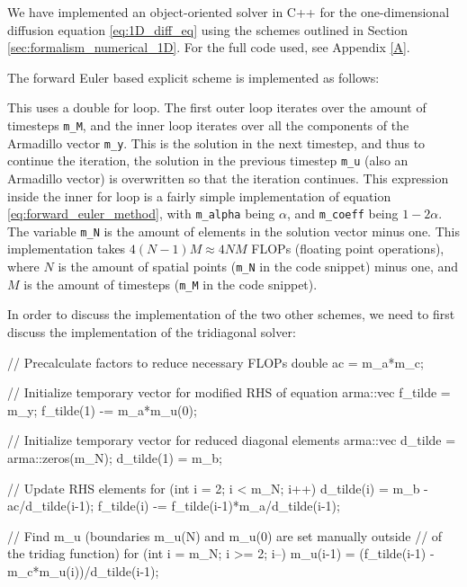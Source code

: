\documentclass[reprint,english,notitlepage]{revtex4-1}  %
\begin{document}
We have implemented an object-oriented solver in C++ for the one-dimensional diffusion equation \eqref{eq:1D_diff_eq} using the schemes outlined in Section \ref{sec:formalism_numerical_1D}. For the full code used, see Appendix \ref{A}.

The forward Euler based explicit scheme is implemented as follows:

\begin{cpp}
// Iterate over timesteps
for (int j = 1; j <= m_M; j++){
  // Matrix multiplication with tridiagonal matrix
  for (int i = 1; i < m_N; i++){
    m_y(i) = m_coeff*m_u(i) + m_alpha*(m_u(i+1) + m_u(i-1));
  }

  // Update previous solution
  m_u = m_y;
  }
}
\end{cpp}

This uses a double for loop. The first outer loop iterates over the amount of timesteps \verb+m_M+, and the inner loop iterates over all the components of the Armadillo \citep{Armadillo} vector \verb+m_y+. This is the solution in the next timestep, and thus to continue the iteration, the solution in the previous timestep \verb+m_u+ (also an Armadillo vector) is overwritten so that the iteration continues. This expression inside the inner for loop is a fairly simple implementation of equation \eqref{eq:forward_euler_method}, with \verb+m_alpha+ being $\alpha$, and \verb+m_coeff+ being $1 - 2\alpha$. The variable \verb+m_N+ is the amount of elements in the solution vector minus one. This implementation takes $4(N-1)M \approx 4NM$ FLOPs (floating point operations), where $N$ is the amount of spatial points (\verb+m_N+ in the code snippet) minus one, and $M$ is the amount of timesteps (\verb+m_M+ in the code snippet).

In order to discuss the implementation of the two other schemes, we need to first discuss the implementation of the tridiagonal solver:

\begin{cpp}
// Precalculate factors to reduce necessary FLOPs
double ac = m_a*m_c;

// Initialize temporary vector for modified RHS of equation
arma::vec f_tilde = m_y;
f_tilde(1) -= m_a*m_u(0);

// Initialize temporary vector for reduced diagonal elements
arma::vec d_tilde = arma::zeros(m_N);
d_tilde(1) = m_b;

// Update RHS elements
for (int i = 2; i < m_N; i++){
  d_tilde(i) = m_b - ac/d_tilde(i-1);
  f_tilde(i) -= f_tilde(i-1)*m_a/d_tilde(i-1);
}

// Find m_u (boundaries m_u(N) and m_u(0) are set manually outside
// of the tridiag function)
for (int i = m_N; i >= 2; i--){
  m_u(i-1) = (f_tilde(i-1) - m_c*m_u(i))/d_tilde(i-1);
}
\end{cpp} 
\end{document}
